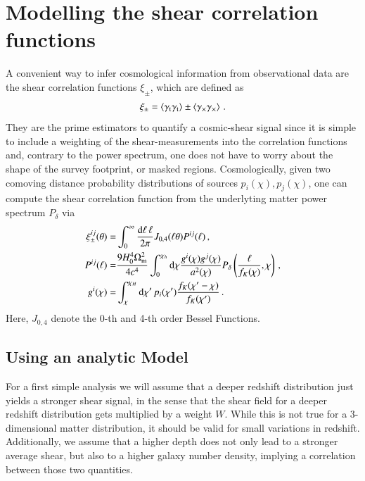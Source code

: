 \section{Modelling the shear correlation functions}
\label{sec:xipm}
A convenient way to infer cosmological information from observational data are the shear correlation functions $\xi_\pm$, which are defined as \[
\xi_\pm = \left< \gamma_{\mathrm t}\gamma_{\mathrm t}\right> \pm \left< \gamma_\times\gamma_\times\right> \, .
\]
They are the prime estimators to quantify a cosmic-shear signal since it is simple to include a weighting of the shear-measurements into the correlation functions and, contrary to the power spectrum, one does not have to worry about the shape of the survey footprint, or masked regions. Cosmologically, given two comoving distance probability distributions of sources $p_i(\chi),p_j(\chi)$, one can compute the shear correlation function from the underlyting matter power spectrum $P_\delta$ via \begin{align}
\label{eq:xipm-pkappa}
\xi_\pm^{ij}(\theta) =& \int_0^\infty \frac{{\rm d}\ell\,\ell}{2\pi}J_{0,4}(\ell\theta)P^{ij}(\ell)\, , \\
\label{eq:pkappa-pdelta/lenseff}
P^{ij}(\ell) =& \frac{9 H_0^4\Omega_{\rm m}^2}{4c^4}\int_0^{\chi_h} {\rm d}\chi\frac{g^i(\chi)g^j(\chi)}{a^2(\chi)}P_\delta\left(\frac{\ell}{f_K(\chi)},\chi\right)\, , \\
\label{eq:lenseff}
g^i(\chi) =& \int_\chi^{\chi_H} {\rm d}\chi'\, p_i(\chi') \frac{f_K(\chi'-\chi)}{f_K(\chi')}\, .
\end{align}
Here, $J_{0,4}$ denote the 0-th and 4-th order Bessel Functions.
\subsection{Using an analytic Model}
\label{sec:xipm_analytic}
For a first simple analysis we will assume that a deeper redshift distribution just yields a stronger shear signal, in the sense that the shear field for a deeper redshift distribution gets multiplied by a weight $W$. While this is not true for a 3-dimensional matter distribution, it should be valid for small variations in redshift. Additionally, we assume that a higher depth does not only lead to a stronger average shear, but also to a higher galaxy number density, implying a correlation between those two quantities.

